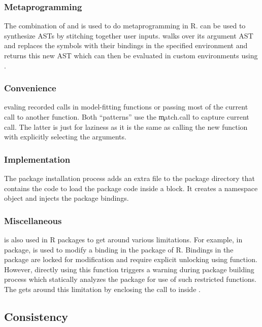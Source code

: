 \documentclass[conference]{IEEEtran}
\begin{document}
  \subsubsection{Metaprogramming} The combination of \eval and \substitute is
  used to do metaprogramming in R. \substitute can be used to synthesize ASTs by
  stitching together user inputs. \substitute walks over its argument AST and
  replaces the symbols with their bindings in the specified environment and
  returns this new AST which can then be evaluated in custom environments using
  \eval.

  \subsubsection{Convenience}
  evaling recorded calls in model-fitting functions or passing most of the
  current call to another function. Both ``patterns'' use the \c{match.call} to
  capture current call. The latter is just for laziness as it is the same as
  calling the new function with explicitly selecting the arguments.

  \subsubsection{Implementation}
  The package installation process adds an extra file to the package directory
  that contains the code to load the package code inside a \local block. It
  creates a namespace object and injects the package bindings.

  \subsubsection{Miscellaneous} \eval is also used in R packages to get around
  various limitations. For example, in \datatable package, \eval is used to modify
  a binding in the \base package of R. Bindings in the \base package are locked
  for modification and require explicit unlocking using \unlockBinding function.
  However, directly using this function triggers a warning during package building
  process which statically analyzes the package for use of such restricted
  functions. The \datatable gets around this limitation by enclosing the call to
  \unlockBinding inside \eval.

\subsection{Consistency}
\end{document}
